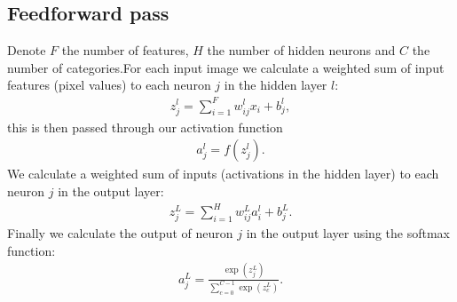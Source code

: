 \documentclass[letterpaper,10pt,english]{sphinxmanual}
\begin{document}
\subsection{Feed\sphinxhyphen{}forward pass}
\label{\detokenize{chapter6:feed-forward-pass}}
Denote \(F\) the number of features, \(H\) the number of hidden neurons and \(C\) the number of categories.For each input image we calculate a weighted sum of input features (pixel values) to each neuron \(j\) in the hidden layer \(l\):
\begin{equation*}
\begin{split} z_{j}^{l} = \sum_{i=1}^{F} w_{ij}^{l} x_i + b_{j}^{l},\end{split}
\end{equation*}
this is then passed through our activation function
\begin{equation*}
\begin{split} a_{j}^{l} = f(z_{j}^{l}) .\end{split}
\end{equation*}
We calculate a weighted sum of inputs (activations in the hidden layer) to each neuron \(j\) in the output layer:
\begin{equation*}
\begin{split} z_{j}^{L} = \sum_{i=1}^{H} w_{ij}^{L} a_{i}^{l} + b_{j}^{L}.\end{split}
\end{equation*}
Finally we calculate the output of neuron \(j\) in the output layer using the softmax function:
\begin{equation*}
\begin{split} a_{j}^{L} = \frac{\exp{(z_j^{L})}}
{\sum_{c=0}^{C-1} \exp{(z_c^{L})}} .\end{split}
\end{equation*}
\end{document}
